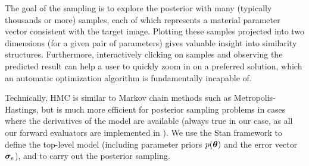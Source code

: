The goal of the sampling is to explore the posterior with many (typically thousands or more) samples, each of which represents a material parameter vector consistent with the target image. Plotting these samples projected into two dimensions (for a given pair of parameters) gives valuable insight into similarity structures. Furthermore, interactively clicking on samples and observing the predicted result can help a user to quickly zoom in on a preferred solution, which an automatic optimization algorithm is fundamentally incapable of.

Technically, HMC is similar to Markov chain methods such as Metropolis-Hastings, but is much more efficient for posterior sampling problems in cases where the derivatives of the model are available (always true in our case, as all our forward evaluators are implemented in \torch). We use the Stan framework to define the top-level model (including parameter priors $p(\bm{\theta})$ and the error vector $\bm{\sigma}_e$), and to carry out the posterior sampling.




